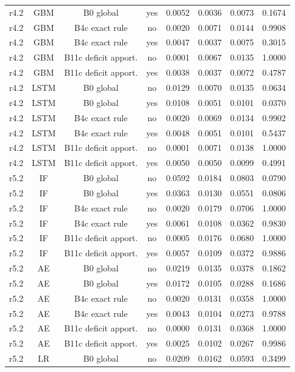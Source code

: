 \documentclass[10pt,onecolumn,letterpaper]{article}
\begin{document}
\begin{table}[!t]
{\begin{tabular}{lccccccc}
r4.2 & GBM & B0 global & yes & 0.0052 & 0.0036 & 0.0073 & 0.1674 \\
r4.2 & GBM & B4c exact rule & no & 0.0020 & 0.0071 & 0.0144 & 0.9908 \\
r4.2 & GBM & B4c exact rule & yes & 0.0047 & 0.0037 & 0.0075 & 0.3015 \\
r4.2 & GBM & B11c deficit apport. & no & 0.0001 & 0.0067 & 0.0135 & 1.0000 \\
r4.2 & GBM & B11c deficit apport. & yes & 0.0038 & 0.0037 & 0.0072 & 0.4787 \\
r4.2 & LSTM & B0 global & no & 0.0129 & 0.0070 & 0.0135 & 0.0634 \\
r4.2 & LSTM & B0 global & yes & 0.0108 & 0.0051 & 0.0101 & 0.0370 \\
r4.2 & LSTM & B4c exact rule & no & 0.0020 & 0.0069 & 0.0134 & 0.9902 \\
r4.2 & LSTM & B4c exact rule & yes & 0.0048 & 0.0051 & 0.0101 & 0.5437 \\
r4.2 & LSTM & B11c deficit apport. & no & 0.0001 & 0.0071 & 0.0138 & 1.0000 \\
r4.2 & LSTM & B11c deficit apport. & yes & 0.0050 & 0.0050 & 0.0099 & 0.4991 \\
r5.2 & IF & B0 global & no & 0.0592 & 0.0184 & 0.0803 & 0.0790 \\
r5.2 & IF & B0 global & yes & 0.0363 & 0.0130 & 0.0551 & 0.0806 \\
r5.2 & IF & B4c exact rule & no & 0.0020 & 0.0179 & 0.0706 & 1.0000 \\
r5.2 & IF & B4c exact rule & yes & 0.0061 & 0.0108 & 0.0362 & 0.9830 \\
r5.2 & IF & B11c deficit apport. & no & 0.0005 & 0.0176 & 0.0680 & 1.0000 \\
r5.2 & IF & B11c deficit apport. & yes & 0.0057 & 0.0109 & 0.0372 & 0.9886 \\
r5.2 & AE & B0 global & no & 0.0219 & 0.0135 & 0.0378 & 0.1862 \\
r5.2 & AE & B0 global & yes & 0.0172 & 0.0105 & 0.0288 & 0.1686 \\
r5.2 & AE & B4c exact rule & no & 0.0020 & 0.0131 & 0.0358 & 1.0000 \\
r5.2 & AE & B4c exact rule & yes & 0.0043 & 0.0104 & 0.0273 & 0.9788 \\
r5.2 & AE & B11c deficit apport. & no & 0.0000 & 0.0131 & 0.0368 & 1.0000 \\
r5.2 & AE & B11c deficit apport. & yes & 0.0025 & 0.0102 & 0.0267 & 0.9986 \\
r5.2 & LR & B0 global & no & 0.0209 & 0.0162 & 0.0593 & 0.3499 \\

\end{tabular}}
\end{table}
\end{document}
